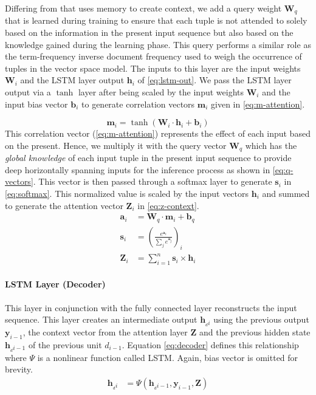Differing from \cite{salton2017attentive} that uses memory to create context, 
we add a query weight $\bm{W}_q$ that is learned during training to ensure that 
each tuple is not attended to solely based on the information in the present 
input sequence but also based on the knowledge gained during the learning 
phase. This query performs a similar role as the term-frequency inverse 
document frequency used to weigh the occurrence of tuples in the vector space 
model. The inputs to this layer are the 
input weights $\bm{W}_i$ and the LSTM layer output $\bm{h}_{i} $ of 
\eqref{eq:lstm-out}. We pass the LSTM layer output via a $\tanh$ layer after 
being scaled by the input weights $\bm{W}_i $ and the input bias vector $ 
\bm{b}_i $ to generate correlation vectors $ \bm{m}_i $ given in 
\eqref{eq:m-attention}.

\begin{equation}
\label{eq:m-attention}
\bm{m}_i = \tanh (\bm{W}_{i} \cdot \bm{h}_{i} + \bm{b}_i)
\end{equation}
This correlation vector (\eqref{eq:m-attention}) represents the effect 
of each input based on the present. Hence, we multiply it with the query 
vector $ \bm{W}_q $ which has the \emph{global knowledge} of each input tuple 
in the present input sequence to provide deep horizontally spanning inputs for 
the inference process as shown in \eqref{eq:q-vectors}. This vector is then 
passed through a softmax layer to generate $ \bm{s}_i $ in \eqref{eq:softmax}. 
This normalized value is scaled by the input vectors $ 
\bm{h}_{i}$ and summed to generate the attention vector $ \bm{Z}_i $ in 
\eqref{eq:z-context}.
\begin{align}
\bm{a}_i &= \bm{W}_{q} \cdot \bm{m}_i + \bm{b}_q \label{eq:q-vectors} \\
\bm{s}_i &= \left( \frac{e^{\bm{a}_i}}{\sum_j e^{\bm{a}_j}}\right)_i 
\label{eq:softmax} \\
\bm{Z}_i &= \sum_{i=1}^n \bm{s}_i \times \bm{h}_{i} \label{eq:z-context}
\end{align}

\paragraph{LSTM Layer (Decoder)}
This layer in conjunction with the fully 
connected layer reconstructs the input sequence. This layer creates an 
intermediate output $ \bm{h}_{_di} $ using the previous output $ \bm{y}_{i-1} 
$, the context vector from the attention layer $ \bm{Z} $ and the previous
hidden state $\bm{h}_{_di-1}$ of the previous unit $ d_{i-1} $. Equation 
\eqref{eq:decoder} defines this relationship where $ \Psi $ is a nonlinear 
function called LSTM. Again, bias vector is omitted for brevity.
\begin{align}
\bm{h}_{_di} &= \Psi\left(\bm{h}_{_di-1},\bm{y}_{i-1},\bm{Z}\right) 
\label{eq:decoder}
\end{align}

